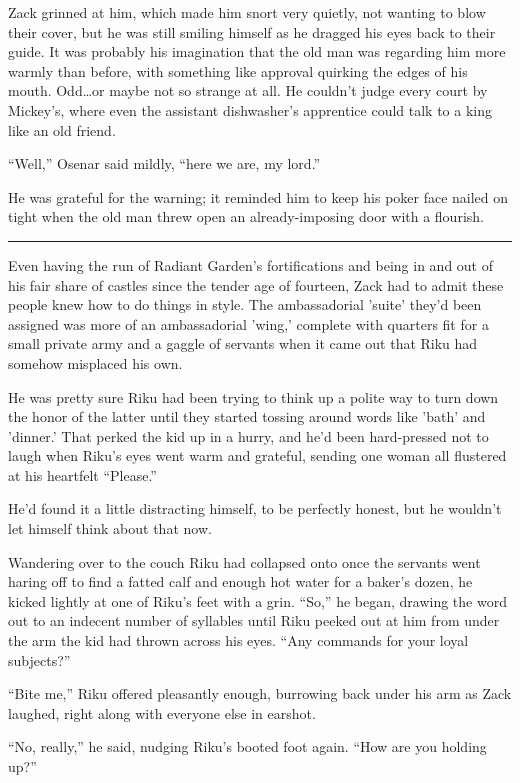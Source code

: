 Zack grinned at him, which made him snort very quietly, not wanting to blow their cover, but he was still smiling himself as he dragged his eyes back to their guide. It was probably his imagination that the old man was regarding him more warmly than before, with something like approval quirking the edges of his mouth. Odd\ldots or maybe not so strange at all. He couldn't judge every court by Mickey's, where even the assistant dishwasher's apprentice could talk to a king like an old friend.

``Well,'' Osenar said mildly, ``here we are, my lord.''

He was grateful for the warning; it reminded him to keep his poker face nailed on tight when the old man threw open an already-imposing door with a flourish.

\fancybreak{\pfbreakdisplay}


Even having the run of Radiant Garden's fortifications and being in and out of his fair share of castles since the tender age of fourteen, Zack had to admit these people knew how to do things in style. The ambassadorial 'suite' they'd been assigned was more of an ambassadorial 'wing,' complete with quarters fit for a small private army and a gaggle of servants when it came out that Riku had somehow misplaced his own.

He was pretty sure Riku had been trying to think up a polite way to turn down the honor of the latter until they started tossing around words like 'bath' and 'dinner.' That perked the kid up in a hurry, and he'd been hard-pressed not to laugh when Riku's eyes went warm and grateful, sending one woman all flustered at his heartfelt ``Please.''

He'd found it a little distracting himself, to be perfectly honest, but he wouldn't let himself think about that now.

Wandering over to the couch Riku had collapsed onto once the servants went haring off to find a fatted calf and enough hot water for a baker's dozen, he kicked lightly at one of Riku's feet with a grin. ``So,'' he began, drawing the word out to an indecent number of syllables until Riku peeked out at him from under the arm the kid had thrown across his eyes. ``Any commands for your loyal subjects?''

``Bite me,'' Riku offered pleasantly enough, burrowing back under his arm as Zack laughed, right along with everyone else in earshot.

``No, really,'' he said, nudging Riku's booted foot again. ``How are you holding up?''

